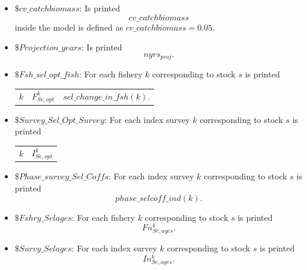 \documentclass{article}
\begin{document}
\begin{itemize}
\begin{center}
\begin{tabular}{c c c}
    \end{tabular}
\end{center}

\item $\$ cv\_catchbiomass$: Is printed
\begin{equation*}
    cv\_catchbiomass
\end{equation*}
inside the model is defined as $cv\_catchbiomass = 0.05$.
\item $\$ Projection\_years$: Is printed
\begin{equation*}
    nyrs_{proj}.
\end{equation*}

\item $\$ Fsh\_sel\_opt\_fish$: For each fishery $k$ corresponding to stock $s$ is printed
\begin{center}
    \begin{tabular}{c c c}
       $k$  &  $F^k_{Se,opt}$ & $sel\_change\_in\_fsh(k)$.\\ 
    \end{tabular}
\end{center}

\item $\$ Survey\_Sel\_Opt\_Survey$: For each index survey $k$ corresponding to stock $s$ is printed
\begin{center}
    \begin{tabular}{c c}
        $k$ &  $I_{Se,opt}^k$\\
    \end{tabular}
\end{center}

\item $\$ Phase\_survey\_Sel\_Coffs$: For each index survey $k$ corresponding to stock $s$ is printed
\begin{equation*}
    phase\_selcoff\_ind(k).
\end{equation*}

\item $\$ Fshry\_Selages $: For each fishery $k$ corresponding to stock $s$ is printed
\begin{equation*}
    Fn_{Se,ages}^k.
\end{equation*}

\item $\$ Survy\_Selages$: For each index survey $k$ corresponding to stock $s$ is printed
\begin{equation*}
    In_{Se,ages}^k.
\end{equation*}


\end{itemize}
\end{document}
